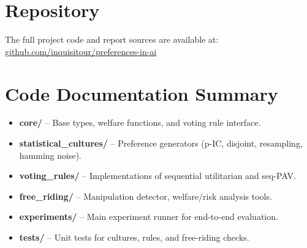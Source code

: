 \documentclass[11pt]{article}
\begin{document}
\section*{Repository}
The full project code and report sources are available at: \\
\href{https://github.com/inquisitour/preferences-in-ai}{github.com/inquisitour/preferences-in-ai}

\appendix
\section{Code Documentation Summary}
\begin{itemize}
  \item \textbf{core/} – Base types, welfare functions, and voting rule interface.
  \item \textbf{statistical\_cultures/} – Preference generators (p-IC, disjoint, resampling, hamming noise).
  \item \textbf{voting\_rules/} – Implementations of sequential utilitarian and seq-PAV.
  \item \textbf{free\_riding/} – Manipulation detector, welfare/risk analysis tools.
  \item \textbf{experiments/} – Main experiment runner for end-to-end evaluation.
  \item \textbf{tests/} – Unit tests for cultures, rules, and free-riding checks.
\end{itemize}



\end{document}
